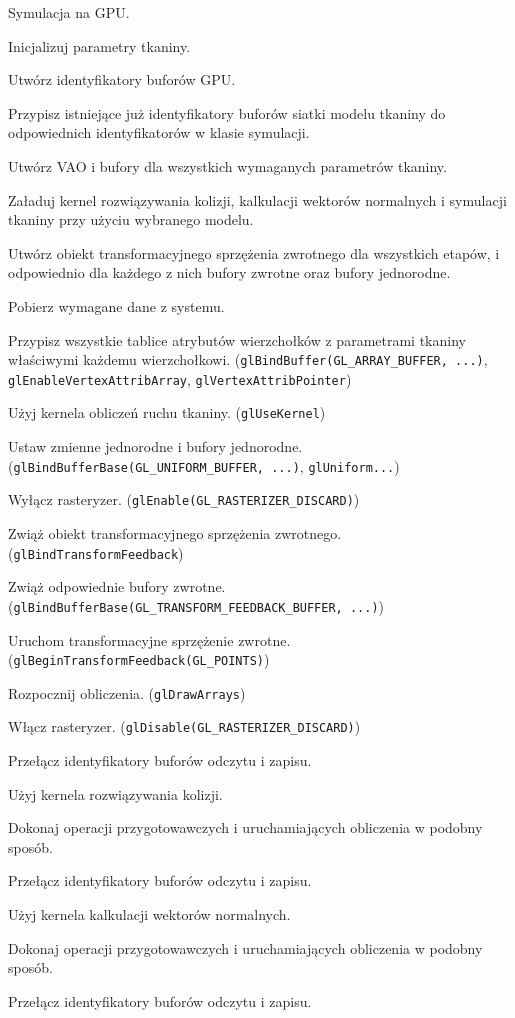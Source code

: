 		\begin{algorithm}
			\label{alg_5_1}
			\caption{Symulacja na GPU.}	
			
			Inicjalizuj parametry tkaniny.
			
			Utwórz identyfikatory buforów GPU.
			
			Przypisz istniejące już identyfikatory buforów siatki modelu tkaniny do odpowiednich identyfikatorów w klasie symulacji.
			
			Utwórz VAO i bufory dla wszystkich wymaganych parametrów tkaniny.
			
			Załaduj kernel rozwiązywania kolizji, kalkulacji wektorów normalnych i symulacji tkaniny przy użyciu wybranego modelu.
			
			Utwórz obiekt transformacyjnego sprzężenia zwrotnego dla wszystkich etapów, i odpowiednio dla każdego z nich bufory zwrotne oraz bufory jednorodne.

			{
				Pobierz wymagane dane z systemu. 
				
				Przypisz wszystkie tablice atrybutów wierzchołków z parametrami tkaniny właściwymi każdemu wierzchołkowi. (\texttt{glBindBuffer(GL\_ARRAY\_BUFFER, ...)}, \texttt{glEnableVertexAttribArray}, \texttt{glVertexAttribPointer})
				
				Użyj kernela obliczeń ruchu tkaniny. (\texttt{glUseKernel})
				
				Ustaw zmienne jednorodne i bufory jednorodne. (\texttt{glBindBufferBase(GL\_UNIFORM\_BUFFER, ...)}, \texttt{glUniform...})
				
				Wyłącz rasteryzer. (\texttt{glEnable(GL\_RASTERIZER\_DISCARD)})
				
				Zwiąż obiekt transformacyjnego sprzężenia zwrotnego. (\texttt{glBindTransformFeedback})
				
				Zwiąż odpowiednie bufory zwrotne. (\texttt{glBindBufferBase(GL\_TRANSFORM\_FEEDBACK\_BUFFER, ...)})
				
				Uruchom transformacyjne sprzężenie zwrotne. (\texttt{glBeginTransformFeedback(GL\_POINTS)})
				
				Rozpocznij obliczenia. (\texttt{glDrawArrays})
				
				Włącz rasteryzer. (\texttt{glDisable(GL\_RASTERIZER\_DISCARD)})
				
				Przełącz identyfikatory buforów odczytu i zapisu.
				
				Użyj kernela rozwiązywania kolizji.
				
				Dokonaj operacji przygotowawczych i uruchamiających obliczenia w podobny sposób.
				
				Przełącz identyfikatory buforów odczytu i zapisu.
				
				Użyj kernela kalkulacji wektorów normalnych.
				
				Dokonaj operacji przygotowawczych i uruchamiających obliczenia w podobny sposób.
				
				Przełącz identyfikatory buforów odczytu i zapisu.
			}
		\end{algorithm}
		
